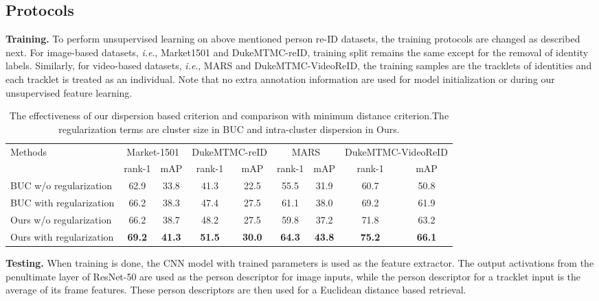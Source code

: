 \documentclass[journal]{IEEEtran}
\newcommand{\ie}{\textit{i.e}.}
\begin{document}
\subsection{Protocols}
\label{subsec:protocols}

\textbf{Training.}
To perform unsupervised learning on above mentioned person re-ID datasets, the training protocols are changed as described next. For image-based datasets, \ie, Market1501 and DukeMTMC-reID, training split remains the same except for the removal of identity labels. Similarly, for video-based datasets, \ie, MARS and DukeMTMC-VideoReID, the training samples are the tracklets of identities and each tracklet is treated as an individual. Note that no extra annotation information are used for model initialization or during our unsupervised feature learning.  
\begin{table*}[htb]
\caption{The effectiveness of our dispersion based criterion and comparison with minimum distance criterion.The  regularization terms are cluster size in BUC and intra-cluster dispersion in Ours.}
\begin{center}
\label{tab:component}
\begin{tabular}{l|cc|cc|cc|cc}
\hline
\multirow{2}{*}{Methods} & \multicolumn{2}{c|}{Market-1501} & \multicolumn{2}{c|}{DukeMTMC-reID} & \multicolumn{2}{c|}{MARS} & \multicolumn{2}{c}{DukeMTMC-VideoReID} \\ \cline{2-9}
 & rank-1 & mAP & rank-1 & mAP & rank-1 & mAP & rank-1 & mAP \\ \hline
BUC w/o regularization \cite{lin2019bottom} & 62.9 & 33.8 & 41.3 & 22.5 & 55.5 & 31.9 & 60.7 & 50.8 \\ 
BUC with regularization\cite{lin2019bottom} & 66.2 & 38.3 & 47.4 & 27.5 & 61.1 & 38.0 & 69.2 & 61.9 \\\hline
Ours w/o regularization & 66.2 & 38.7 & 48.2 & 27.5 & 59.8 & 37.2 & 71.8 & 63.2 \\ 
Ours with regularization & \textbf{69.2} & \textbf{41.3} & \textbf{51.5} & \textbf{30.0} &\textbf{64.3} & \textbf{43.8} &\textbf{75.2} & \textbf{66.1} \\ 
\hline
\end{tabular}
\end{center}
\end{table*} 
\textbf{Testing.} 
When training is done, the CNN model with trained parameters is used as the feature extractor. The output activations from the penultimate layer of ResNet-50 are used as the person descriptor for image inputs, while the person descriptor for a tracklet input is the average of its frame features. These person descriptors are then used for a Euclidean distance based retrieval.
\end{document}
